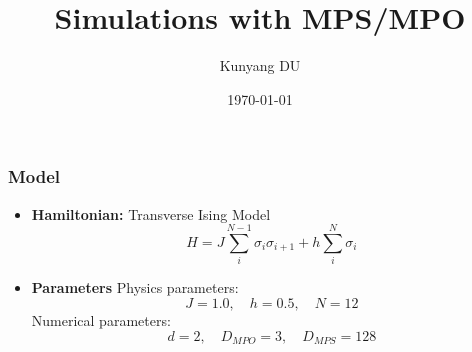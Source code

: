 \documentclass{beamer}
\title{Simulations with MPS/MPO}
\author{Kunyang DU}
\institute{Institue of Theoretical Physics}
\date{\today}
\begin{document}
\begin{frame}
	\titlepage
\end{frame}

\begin{frame}
	\frametitle{Model}
	\begin{itemize}
		\item \textbf{Hamiltonian:} Transverse Ising Model
		\begin{equation}
			H = J\sum_{i}^{N-1}\sigma_i \sigma_{i+1} + h\sum_i^N\sigma_i
		\end{equation}
		\item \textbf{Parameters} Physics parameters:
		\begin{equation}
			J = 1.0,\quad h = 0.5,\quad N = 12
		\end{equation}
		Numerical parameters:
		\begin{equation}
			d = 2,\quad D_{MPO} = 3, \quad D_{MPS} = 128
		\end{equation}
	\end{itemize}
\end{frame}
\end{document}

